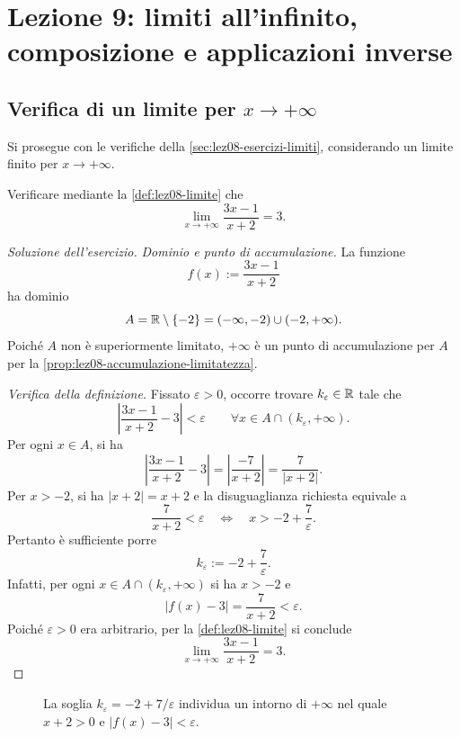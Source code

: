 \chapter[Lezione 9 --- 16 ottobre 2026]{Lezione 9: limiti all'infinito, composizione e applicazioni inverse}
\label{chap:lezione-09}

\section[Verifica di un limite all'infinito]{Verifica di un limite per \(x\to+\infty\)}
\label{sec:lez09-limite-infinito}

Si prosegue con le verifiche della
\cref{sec:lez08-esercizi-limiti}, considerando
un limite finito per \(x\to+\infty\).

\begin{exercise}
\label{ex:lez09-limite-razionale-infinito}
Verificare mediante la \cref{def:lez08-limite} che
\[
  \lim_{x\to+\infty}\frac{3x-1}{x+2}=3.
\]
\end{exercise}

\begin{proof}[Soluzione dell'esercizio]
\emph{Dominio e punto di accumulazione.}
La funzione
\[
  f(x):=\frac{3x-1}{x+2}
\]
ha dominio
\[
  A=\mathbb{R}\setminus\{-2\}
   =(-\infty,-2)\cup(-2,+\infty).
\]
Poiché \(A\) non è superiormente limitato,
\(+\infty\) è un punto di accumulazione per \(A\)
per la \cref{prop:lez08-accumulazione-limitatezza}.

\emph{Verifica della definizione.}
Fissato \(\varepsilon>0\), occorre trovare
\(k_\varepsilon\in\mathbb{R}\) tale che
\[
  \left|\frac{3x-1}{x+2}-3\right|<\varepsilon
  \qquad\forall x\in A\cap(k_\varepsilon,+\infty).
\]
Per ogni \(x\in A\), si ha
\[
  \left|\frac{3x-1}{x+2}-3\right|
  =\left|\frac{-7}{x+2}\right|
  =\frac7{|x+2|}.
\]
Per \(x>-2\), si ha \(|x+2|=x+2\) e la
disuguaglianza richiesta equivale a
\[
  \frac7{x+2}<\varepsilon
  \quad\Longleftrightarrow\quad
  x>-2+\frac7\varepsilon.
\]
Pertanto è sufficiente porre
\[
  k_\varepsilon:=-2+\frac7\varepsilon.
\]
Infatti, per ogni \(x\in A\cap(k_\varepsilon,+\infty)\)
si ha \(x>-2\) e
\[
  |f(x)-3|
  =\frac7{x+2}<\varepsilon.
\]
Poiché \(\varepsilon>0\) era arbitrario, per la
\cref{def:lez08-limite} si conclude
\[
  \lim_{x\to+\infty}\frac{3x-1}{x+2}=3.
\]
\end{proof}

\clearpage

\begin{figure}[htbp]
  \centering
  
  \caption{La soglia \(k_\varepsilon=-2+7/\varepsilon\)
  individua un intorno di \(+\infty\) nel quale
  \(x+2>0\) e \(|f(x)-3|<\varepsilon\).}
  \label{fig:lez09-limite-razionale-infinito}
\end{figure}

